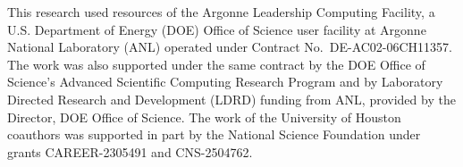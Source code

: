 \documentclass[sigconf,nonacm]{aamas}
\begin{document}
\begin{acks}
This research used resources of the Argonne Leadership Computing Facility, a U.S. Department of Energy (DOE) Office of Science user facility at Argonne National Laboratory (ANL) operated under Contract No.~DE-AC02-06CH11357. The work was also supported under the same contract by the DOE Office of Science's Advanced Scientific Computing Research Program and by Laboratory Directed Research and Development (LDRD) funding from ANL, provided by the Director, DOE Office of Science. The work of the University of Houston coauthors was supported in part by the National Science Foundation under grants CAREER-2305491 and CNS-2504762.
\end{acks}




\clearpage

\end{document}
